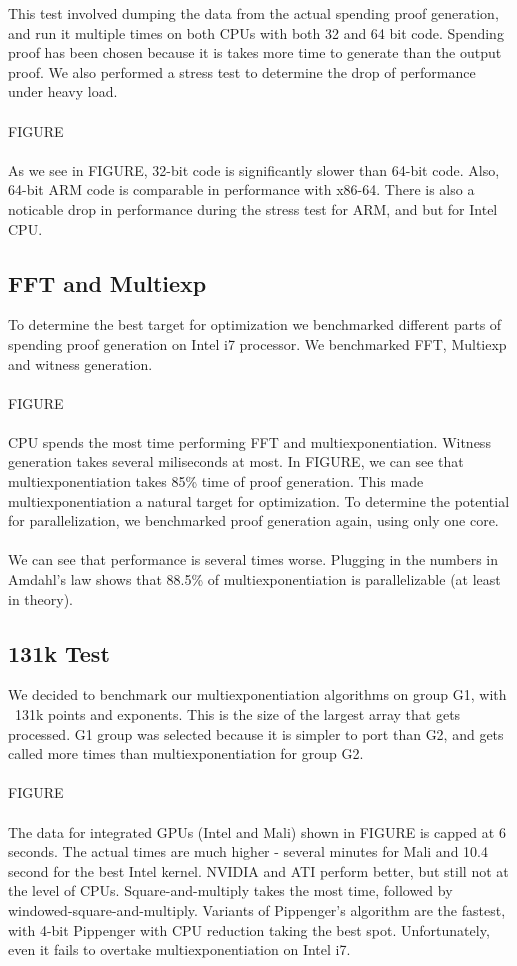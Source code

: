 This test involved dumping the data from the actual spending proof generation, and run it multiple times on both CPUs with both 32 and 64 bit code. Spending proof has been chosen because it is takes more time to generate than the output proof. We also performed a stress test to determine the drop of performance under heavy load.\\
\\
FIGURE\\
\\
As we see in FIGURE, 32-bit code is significantly slower than 64-bit code. Also, 64-bit ARM code is comparable in performance with x86-64. There is also a noticable drop in performance during the stress test for ARM, and but for Intel CPU.

\subsection{FFT and Multiexp}

To determine the best target for optimization we benchmarked different parts of spending proof generation on Intel i7 processor. We benchmarked FFT, Multiexp and witness generation.\\
\\
FIGURE\\
\\
CPU spends the most time performing FFT and multiexponentiation. Witness generation takes several miliseconds at most. In FIGURE, we can see that multiexponentiation takes 85\% time of proof generation. This made multiexponentiation a natural target for optimization. To determine the potential for parallelization, we benchmarked proof generation again, using only one core.\\
\\
We can see that performance is several times worse. Plugging in the numbers in Amdahl's law shows that 88.5\% of multiexponentiation is parallelizable (at least in theory).

\subsection{131k Test}

We decided to benchmark our multiexponentiation algorithms on group G1, with ~131k points and exponents. This is the size of the largest array that gets processed. G1 group was selected because it is simpler to port than G2, and gets called more times than multiexponentiation for group G2.\\
\\
FIGURE\\
\\
The data for integrated GPUs (Intel and Mali) shown in FIGURE is capped at 6 seconds. The actual times are much higher - several minutes for Mali and 10.4 second for the best Intel kernel. NVIDIA and ATI perform better, but still not at the level of CPUs. Square-and-multiply takes the most time, followed by windowed-square-and-multiply. Variants of Pippenger's algorithm are the fastest, with 4-bit Pippenger with CPU reduction taking the best spot. Unfortunately, even it fails to overtake multiexponentiation on Intel i7.
